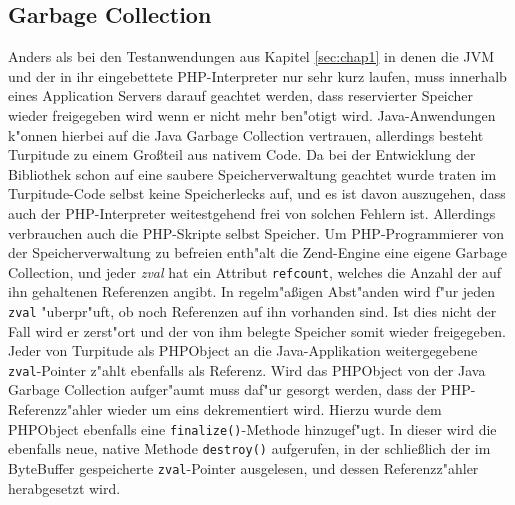 \subsection{Garbage Collection}
\label{sec:chap2:turp:zendgc}

Anders als bei den Testanwendungen aus Kapitel \ref{sec:chap1} in denen die JVM und der in ihr eingebettete PHP-Interpreter
nur sehr kurz laufen, muss innerhalb eines Application Servers darauf geachtet werden, dass reservierter Speicher
wieder freigegeben wird wenn er nicht mehr ben"otigt wird. Java-Anwendungen k"onnen hierbei auf die Java Garbage Collection
vertrauen, allerdings besteht Turpitude zu einem Gro\ss teil aus nativem Code. Da bei der Entwicklung der Bibliothek schon
auf eine saubere Speicherverwaltung geachtet wurde traten im Turpitude-Code selbst keine Speicherlecks auf, und es ist
davon auszugehen, dass auch der PHP-Interpreter weitestgehend frei von solchen Fehlern ist. Allerdings verbrauchen auch
die PHP-Skripte selbst Speicher. Um PHP-Programmierer von der Speicherverwaltung zu befreien enth"alt die Zend-Engine 
eine eigene Garbage Collection, und jeder \emph{zval} hat ein Attribut \texttt{refcount}, welches die Anzahl der auf ihn gehaltenen
Referenzen angibt. In regelm"a\ss igen Abst"anden wird f"ur jeden \texttt{zval} "uberpr"uft, ob noch Referenzen auf ihn vorhanden sind.
Ist dies nicht der Fall wird er zerst"ort und der von ihm belegte Speicher somit wieder freigegeben.
Jeder von Turpitude als PHPObject an die Java-Applikation weitergegebene \texttt{zval}-Pointer z"ahlt ebenfalls als Referenz.
Wird das PHPObject von der Java Garbage Collection aufger"aumt muss daf"ur gesorgt werden, dass der
PHP-Referenzz"ahler wieder um eins dekrementiert wird.
Hierzu wurde dem PHPObject ebenfalls eine \texttt{finalize()}-Methode hinzugef"ugt. In dieser wird die ebenfalls neue,
native Methode \texttt{destroy()} aufgerufen, in der schlie\ss lich der im ByteBuffer gespeicherte \texttt{zval}-Pointer
ausgelesen, und dessen Referenzz"ahler herabgesetzt wird.



